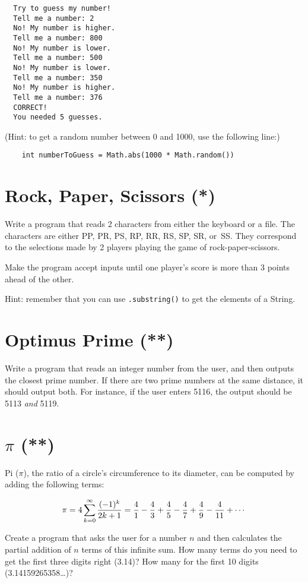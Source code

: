 \documentclass{article}
\begin{document}
\begin{verbatim}
  Try to guess my number!
  Tell me a number: 2
  No! My number is higher. 
  Tell me a number: 800
  No! My number is lower.
  Tell me a number: 500
  No! My number is lower.
  Tell me a number: 350
  No! My number is higher.
  Tell me a number: 376
  CORRECT!
  You needed 5 guesses. 
\end{verbatim}

(Hint: to get a random number between 0 and 1000, use the following
line:)

\begin{verbatim}
    int numberToGuess = Math.abs(1000 * Math.random())
\end{verbatim}

\section{Rock, Paper, Scissors (*)}
\label{sec:rock-paper-scissors}

Write a program that reads 2 characters from either the keyboard or a
file. The characters are either PP, PR, PS, RP, RR, RS, SP, SR,
or~SS. They correspond to the selections made by 2 players playing the 
game of rock-paper-scissors. 

Make the program accept inputs until one player's score is more than 3
points ahead of the other. 

Hint: remember that you can use \verb+.substring()+ to get the
elements of a String. 

\section{Optimus Prime (**)}
\label{sec:optimus-prime}

Write a program that reads an integer number from the user, and then
outputs the closest prime number. If there are two prime numbers at
the same distance, it should output both. For instance, if the user
enters 5116, the output should be 5113 \emph{and} 5119. 

\section{$\pi$ (**)}
\label{sec:pi-}

Pi ($\pi$), the ratio of a circle's circumference to its diameter, 
can be computed by adding the following terms: 

$$ \pi = 4 \sum^{\infty}_{k=0} {(-1)^k \over 2k+1} = 
  {4 \over 1} - {4 \over 3} + {4 \over 5} - {4 \over 7} 
  + {4 \over 9} - {4 \over 11} + \cdots $$

Create a program that asks the user for a number $n$ and then
calculates the partial addition of $n$ terms of this infinite sum. 
How many terms do you need to get
the first three digits right (3.14)? How many for the first 10 digits
(3.14159265358\ldots)?
\end{document}
